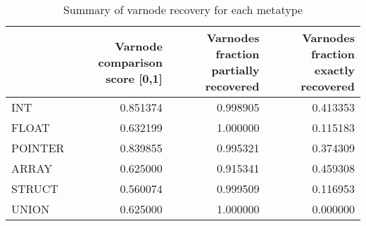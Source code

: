 \begin{table}
\centering
\caption{Summary of varnode recovery for each metatype}
\label{table:metatype-recovery-summary}
\begin{tabular}{lrrr}
\toprule
{} &  Varnode comparison score [0,1] &  Varnodes fraction partially recovered &  Varnodes fraction exactly recovered \\
\midrule
INT     &                        0.851374 &                               0.998905 &                             0.413353 \\
FLOAT   &                        0.632199 &                               1.000000 &                             0.115183 \\
POINTER &                        0.839855 &                               0.995321 &                             0.374309 \\
ARRAY   &                        0.625000 &                               0.915341 &                             0.459308 \\
STRUCT  &                        0.560074 &                               0.999509 &                             0.116953 \\
UNION   &                        0.625000 &                               1.000000 &                             0.000000 \\
\bottomrule
\end{tabular}
\end{table}
